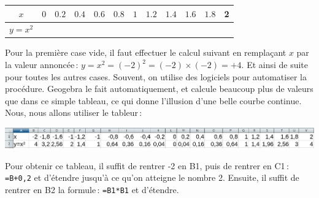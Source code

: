 			\begin{tabular}{|c|c|c|c|c|c|c|c|c|c|c|c|}
				\hline
				$x$     &$  0 $&$ 0.2    $&$ 0.4 $&$ 0.6  $&$ 0.8  $&$ 1   $&$1.2    $&$ 1.4 $&$ 1.6   $&$ 1.8  $& 2\\
				\hline
				$y=x^2$ &       &         &       &        &        &      &         &       &         &        & \\
				\hline
			\end{tabular}

			Pour la première case vide, il faut effectuer le calcul suivant en remplaçant $x$ par la valeur annoncée\,: $y=x^2=(-2)^2=(-2)\times(-2)=+4$. Et ainsi de suite pour toutes les autres cases. Souvent, on utilise des logiciels pour automatiser la procédure. Geogebra le fait automatiquement, et calcule beaucoup plus de valeurs que dans ce simple tableau, ce qui donne l'illusion d'une belle courbe continue. Nous, nous allons utiliser le tableur\,:

			\noindent\includegraphics[width=\textwidth]{image/calcul/valfctcar.png}

			Pour obtenir ce tableau, il suffit de rentrer -2 en B1, puis de rentrer en C1\,: \texttt{=B+0,2} et d'étendre jusqu'à ce qu'on atteigne le nombre 2. Ensuite, il suffit de rentrer en B2 la formule\,: \texttt{=B1*B1} et d'étendre.


